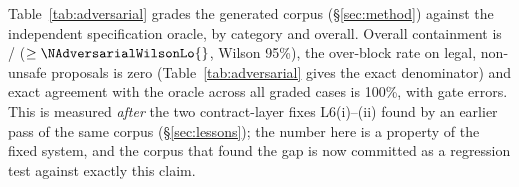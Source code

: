 Table~\ref{tab:adversarial} grades the generated corpus (\S\ref{sec:method}) against the independent
specification oracle, by category and overall. Overall containment is
\NAdversarialContained{}/\NAdversarialUnsafe{} ($\geq\NAdversarialWilsonLo{}$, Wilson 95\%), the
over-block rate on legal, non-unsafe proposals is zero (Table~\ref{tab:adversarial} gives the exact
denominator) and exact agreement with the oracle across all \NAdversarialCases{} graded cases is 100\%,
with \NAdversarialGateErrors{} gate errors. This is
measured \emph{after} the two contract-layer fixes L6(i)--(ii) found by an earlier pass of the same
corpus (\S\ref{sec:lessons}); the number here is a property of the fixed system, and the corpus that
found the gap is now committed as a regression test against exactly this claim.
